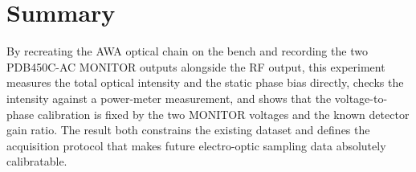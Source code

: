 \documentclass[11pt]{article}
\begin{document}
\section{Summary}

By recreating the AWA optical chain on the bench and recording the two PDB450C-AC MONITOR
outputs alongside the RF output, this experiment measures the total optical intensity and
the static phase bias directly, checks the intensity against a power-meter measurement,
and shows that the voltage-to-phase calibration is fixed by the two MONITOR voltages and
the known detector gain ratio. The result both constrains the existing dataset and
defines the acquisition protocol that makes future electro-optic sampling data
absolutely calibratable.
\end{document}
